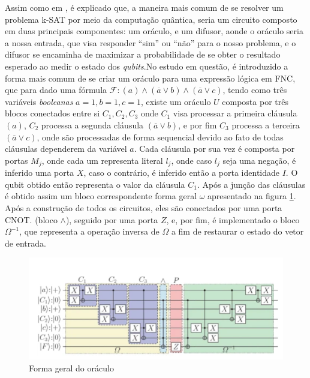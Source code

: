 \documentclass[12pt]{article}
\begin{document}
Assim como em \textbf{\cite{parallelAndDistributed}}, é explicado que, a maneira mais comum de se resolver um problema k-SAT por meio da computação quântica, seria um circuito composto em duas principais componentes: um oráculo, e um difusor, aonde o oráculo seria a nossa entrada, que visa responder ``sim'' ou ``não'' para o nosso problema, e o difusor se encaminha de maximizar a probabilidade de se obter o resultado esperado ao medir o estado dos \textit{qubits}.No estudo em questão, é introduzido a forma mais comum de se criar um oráculo para uma expressão lógica em FNC, que para dado uma fórmula $
\mathcal {F}: (a) \wedge (\overline{a} \vee b) \wedge (\overline{a} \vee c)
$, tendo como três variáveis \textit{booleanas} $a=1, b=1, c=1$, existe um oráculo ${U}$ composta por três blocos conectados entre si $C_1, C_2, C_3$ onde $C_1$ visa processar a primeira cláusula $(a)$, $C_2$ processa a segunda cláusula
$(\overline{a} \vee b)$, e por fim $C_3$ processa a terceira $(\overline{a} \vee c)$, onde são processadas de forma sequencial devido ao fato de todas cláusulas dependerem da variável $a$.
Cada cláusula por sua vez é composta por portas $M_j$, onde cada um representa literal $l_j$, onde caso $l_j$ seja uma negação, é inferido uma porta $X$, caso o contrário, é inferido então a porta identidade $I$. O qubit obtido então representa o valor da cláusula $C_1$. Após a junção das cláusulas é obtido assim um bloco correspondente forma geral $\omega$ apresentado na figura \ref{fig:oraculo_forma_geral}. Após a construção de todos os circuitos, eles são conectados por uma porta CNOT. (bloco $\wedge$), seguido por uma porta $Z$, e, por fim, é implementado o bloco $\Omega ^{-1}$, que representa a operação inversa de $\Omega$ a fim de restaurar o estado do vetor de entrada.
\begin{figure}
    \centering
    \includegraphics[width=0.7\linewidth]{oraculo_convencional.png}
    \caption{Forma geral do oráculo \cite{parallelAndDistributed}}
\label{fig:oraculo_forma_geral}
\end{figure}
\end{document}
